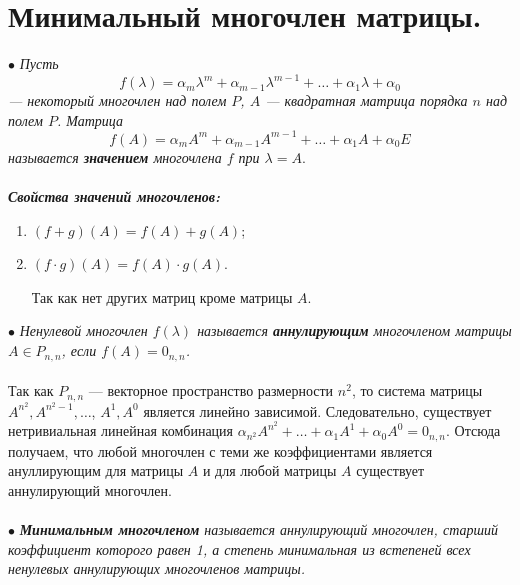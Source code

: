 \section{Минимальный многочлен матрицы.}
$\bullet$ \textit{Пусть $$f(\lambda) = \alpha_m \lambda^m + \alpha_{m-1} \lambda^{m-1} + \ldots + \alpha_1 \lambda + \alpha_0$$ --- некоторый многочлен над полем $P$, $A$ --- квадратная матрица порядка $n$ над полем $P$. Матрица $$f(A) = \alpha_m A^m + \alpha_{m-1} A^{m-1} + \ldots + \alpha_1 A + \alpha_0 E$$ называется \textbf{значением} многочлена $f$ при $\lambda = A.$}\\\\
\textit{\textbf{Свойства значений многочленов:}}\begin{enumerate}
	\item $(f+g) (A) = f(A) + g(A)$;
	\item $(f\cdot g) (A) = f(A) \cdot g(A)$.\begin{Proof}
		Так как нет других матриц кроме матрицы $A$.
	\end{Proof}
\end{enumerate}
$\bullet$ \textit{Ненулевой многочлен $f(\lambda)$ называется \textbf{аннулирующим} многочленом матрицы $A\in P_{n,n}$, если $f(A) = 0_{n,n}$.}\\\\
Так как $P_{n,n}$ --- векторное пространство размерности $n^2$, то система матрицы $A^{n^2}, A^{n^2 - 1},\dots$, $A^1, A^0$ является линейно зависимой. Следовательно, существует нетривиальная линейная комбинация $\alpha_{n^2}A^{n^2} + \ldots + \alpha_1A^1 + \alpha_0A^0 = 0_{n,n}$. Отсюда получаем, что любой многочлен с теми же коэффициентами является ануллирующим для матрицы $A$ и для любой матрицы $A$ существует аннулирующий многочлен.\\\\
$\bullet$ \textit{\textbf{Минимальным многочленом} называется аннулирующий многочлен, старший коэффициент которого равен 1, а степень минимальная из встепеней всех ненулевых аннулирующих многочленов матрицы.}\\\\
